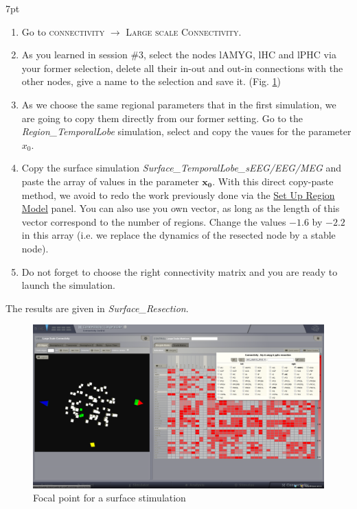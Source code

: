 \documentclass{tufte-handout}
\newenvironment{simulation}{%
  \def\FrameCommand{%
    \hspace{1pt}%
    {\color{ForestGreen}\vrule width 2pt}%
    {\color{simulationshade}\vrule width 4pt}%
    \colorbox{simulationshade}%
  }%
  \MakeFramed{\advance\hsize-\width\FrameRestore}%
  \noindent\hspace{-4.55pt}%
  \begin{adjustwidth}{}{7pt}%
  \vspace{2pt}\vspace{2pt}%
}
{%
  \vspace{2pt}\end{adjustwidth}\endMakeFramed%
}
\begin{document}
\begin{simulation}
  \begin{enumerate}
  \item Go to \textsc{connectivity} $\rightarrow$ \textsc{Large scale Connectivity}.
  \item As you learned in session \#3, select the nodes lAMYG, lHC and lPHC via your former selection, delete all their in-out and out-in connections
  with the other nodes, give a name to the selection and save it. (Fig. \ref{fig:resec})
  \item As we choose the same regional parameters that in the first simulation, we are going to copy them directly from our
  former setting. Go to the \textit{Region\_TemporalLobe} simulation, select and copy the vaues for the parameter  $x_0$. 
  \item Copy the surface simulation \textit{Surface\_TemporalLobe\_sEEG/EEG/MEG} and paste the array of values in the parameter $\mathbf{x_0}$.
  With this direct copy-paste method, we avoid to redo the work previously done via the \underline{Set Up Region Model} panel.
  You can also use you own vector, as long as the length of this vector correspond to the number of regions.
  Change the values $\mathbf{-1.6}$ by $\mathbf{-2.2}$ in this array (i.e. we replace the dynamics of the resected node by a stable node).
  \item Do not forget to choose the right connectivity matrix and you are ready to launch the simulation.
  \end{enumerate}
\end{simulation}

The results are given in \textit{Surface\_Resection}.

\begin{figure}[h]
  \includegraphics[width=\linewidth]{Handout_UI_ModellingAnEpilepticPatient_ConnectivityMatrixResection}%
  \caption{Focal point for a surface stimulation}%
  \label{fig:resec}%
\end{figure}
\end{document}
